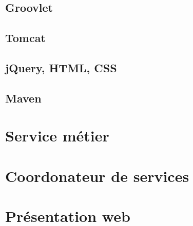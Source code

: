 \documentclass{article}
\begin{document}
\subsection{Groovlet} %
\label{sub:groovlet}

\subsection{Tomcat} %
\label{sub:tomcat}

\subsection{jQuery, HTML, CSS} %
\label{sub:jquery}

\subsection{Maven} %
\label{sub:maven}


\section{Service métier} %
\label{sec:service_metier}

\section{Coordonateur de services} %
\label{sec:coordonateur_de_services}

\section{Présentation web} %
\label{sec:presentation_web}
\end{document}
